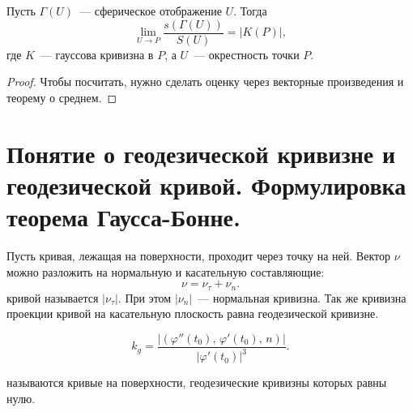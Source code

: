 \documentclass{notes}
\begin{document}
	\begin{thm}
		Пусть $\Gamma(U)$~--- сферическое отображение $U$. Тогда
		\[
			\lim_{U \to P} \dfrac{s(\Gamma(U))}{S(U)} = |K(P)|,
		\]
		где $K$~--- гауссова кривизна в $P$, а $U$~--- окрестность точки $P$.
		\begin{proof}
			Чтобы посчитать, нужно сделать оценку через векторные произведения и теорему о среднем.
		\end{proof}
	\end{thm}

\section{Понятие о геодезической кривизне и геодезической кривой. Формулировка теорема Гаусса-Бонне.}

	\begin{de}
		Пусть кривая, лежащая на поверхности, проходит через точку на ней. Вектор $\nu$ можно разложить на нормальную и касательную составляющие:
		\[
			\nu = \nu_{\tau} + \nu_n.
		\]
		 кривой называется $|\nu_{\tau}|$.
 		При этом $|\nu_n|$~--- нормальная кривизна.
 		Так же кривизна проекции кривой на касательную плоскость равна геодезической кривизне.
	\end{de}

	\begin{st}
		\[
			k_g = \dfrac{|(\varphi''(t_0), \, \varphi'(t_0), \, n)|}{|\varphi'(t_0)|^3}.
		\]
	\end{st}

	\begin{de}
		 называются кривые на поверхности, геодезические кривизны которых равны нулю.
	\end{de}

	
\end{document}
